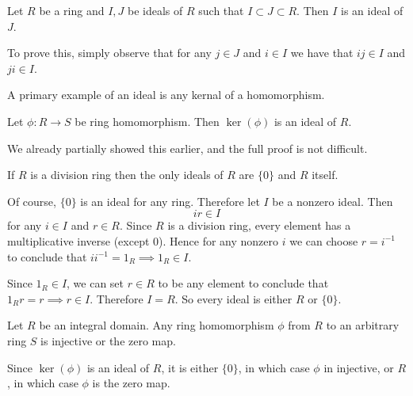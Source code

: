     \begin{proposition}
        Let $R$ be a ring and $I, J$ be ideals of $R$ such that $I
        \subset J \subset R$. Then $I$ is an ideal of $J$.
    \end{proposition}

    \begin{prf}
        To prove this, simply observe that for any $j \in J$ and
        $i \in I$ we have that $ij \in I$ and $ji \in I$. 
    \end{prf}

    A primary example of an ideal is any kernal of a homomorphism.
    
    \begin{lemma}
        Let $\phi:R \to S$ be ring homomorphism. Then $\ker(\phi)$
        is an ideal of $R$.
    \end{lemma}

    We already partially showed this earlier, and the full proof
    is not difficult. 

    \begin{lemma} \label{divison_ring_thm}
        If $R$ is a division ring then the only ideals of $R$ are
        $\{0\}$ and $R$ itself.
    \end{lemma}

    \begin{prf}
        Of course, $\{0\}$ is an ideal for any ring. Therefore let
        $I$ be a nonzero ideal. Then 
        \[ 
            ir \in I
        \] 
        for any $i \in I$ and $r \in R$. Since $R$ is a division ring, every
        element has a multiplicative inverse (except 0). Hence for
        any nonzero $i$ we can choose $r = i^{-1}$ to conclude
        that $ii^{-1} = 1_R \implies 1_R \in I$. 

        Since $1_R \in I$, we can set $r \in R$ to be any element
        to conclude that $1_Rr = r \implies r \in I$. Therefore $I
        = R$. So every ideal is either $R$ or $\{0\}$.
    \end{prf}

    \begin{proposition}
        Let $R$ be an integral domain. Any
        ring homomorphism $\phi$ from $R$ to an arbitrary ring $S$ is
        injective or the zero map.
    \end{proposition}

    \begin{prf}
        Since $\ker(\phi)$ is an ideal of $R$, it is either
        $\{0\}$, in which case $\phi$ in injective, or $R$, in
        which case $\phi$ is the zero map.
    \end{prf}

